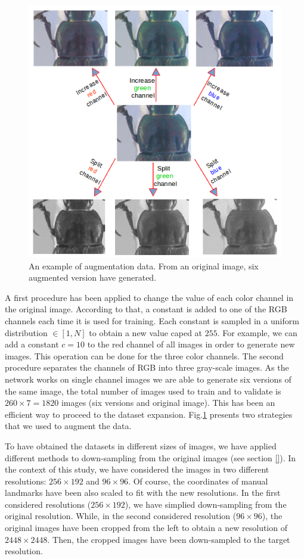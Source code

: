 \documentclass[12pt,a4paper]{article}
\begin{document}
\begin{figure}[h!]
	\centering
	\includegraphics[scale=0.6]{images/cnn_newdatasize/data_aug}
	\caption{An example of augmentation data. From an original image, six augmented version have generated.}
	\label{figdataaug}
\end{figure}

A first procedure has been applied to change the value of
each color channel in the original image. According to that,
a constant is added to one of the RGB channels each time it
is used for training. Each constant is sampled in a uniform
distribution $\in [1,N] $ to obtain a new value caped at $255$. For
example, we can add a constant $c = 10$ to the red channel of
all images in order to generate new images. This operation can
be done for the three color channels. The second procedure separates the channels of RGB into three gray-scale images. As the network works on single channel images we are able to generate six versions of the same image, the total number of images used to train and to validate is
$260 \times 7 = 1820$ images (six versions and original image). This
has been an efficient way to proceed to the dataset expansion. Fig.\ref{figdataaug} presents two strategies that we used to augment the data.

To have obtained the datasets in different sizes of images, we have applied different methods to down-sampling from the original images (see section \ref{}). In the context of this study, we have considered the images in two different resolutions: $256 \times 192$ and $96 \times 96$. Of course, the coordinates of manual landmarks have been also scaled to fit with the new resolutions. In the first considered resolutions ($256 \times 192$), we have simplied down-sampling from the original resolution. While, in the second considered resolution ($96 \times 96$), the original images have been cropped from the left to obtain a new resolution of $2448 \times 2448$. Then, the cropped images have been down-sampled to the target resolution.
\end{document}
